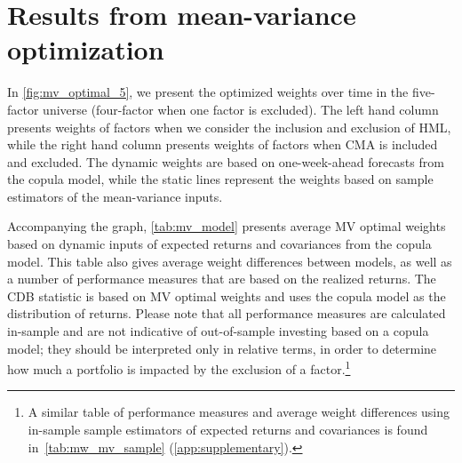 
\section{Results from mean-variance optimization} %
\label{sec:mean_variance}

In \autoref{fig:mv_optimal_5}, we present the optimized weights over time in the five-factor universe (four-factor when one factor is excluded). The left hand column presents weights of factors when we consider the inclusion and exclusion of HML, while the right hand column presents weights of factors when CMA is included and excluded. The dynamic weights are based on one-week-ahead forecasts from the copula model, while the static lines represent the weights based on sample estimators of the mean-variance inputs.

Accompanying the graph, \autoref{tab:mv_model} presents average MV optimal weights based on dynamic inputs of expected returns and covariances from the copula model. This table also gives average weight differences between models, as well as a number of performance measures that are based on the realized returns. The CDB statistic is based on MV optimal weights and uses the copula model as the distribution of returns. Please note that all performance measures are calculated in-sample and are not indicative of out-of-sample investing based on a copula model; they should be interpreted only in relative terms, in order to determine how much a portfolio is impacted by the exclusion of a factor.\footnote{A similar table of performance measures and average weight differences using in-sample sample estimators of expected returns and covariances is found in~\autoref{tab:mw_mv_sample} (\autoref{app:supplementary}).}

